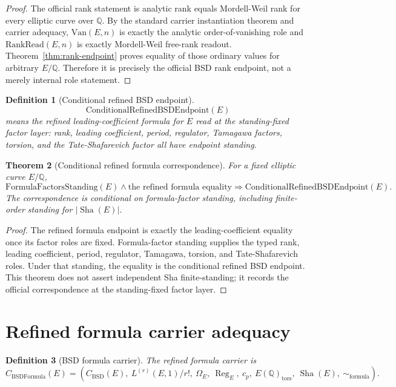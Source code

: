 \documentclass[11pt]{article}
\newtheorem{theorem}{Theorem}[section]
\newtheorem{definition}[theorem]{Definition}
\newcommand{\Q}{\mathbb{Q}}
\newcommand{\Sha}{\operatorname{Sha}}
\newcommand{\Reg}{\operatorname{Reg}}
\newcommand{\tors}{\operatorname{tors}}
\newcommand{\BSD}{\mathrm{BSD}}
\newcommand{\BSDFormula}{\mathrm{BSDFormula}}
\newcommand{\Van}{\mathrm{Van}}
\newcommand{\RankRead}{\mathrm{RankRead}}
\newcommand{\CondRefinedEndpoint}{\mathrm{ConditionalRefinedBSDEndpoint}}
\begin{document}
\begin{proof}
The official rank statement is analytic rank equals Mordell-Weil rank for every elliptic curve over $\Q$. By the standard carrier instantiation theorem and carrier adequacy, $\Van(E,n)$ is exactly the analytic order-of-vanishing role and $\RankRead(E,n)$ is exactly Mordell-Weil free-rank readout. Theorem~\ref{thm:rank-endpoint} proves equality of those ordinary values for arbitrary $E/\Q$. Therefore it is precisely the official BSD rank endpoint, not a merely internal role statement.
\end{proof}

\begin{definition}[Conditional refined BSD endpoint]
\[
\CondRefinedEndpoint(E)
\]
means the refined leading-coefficient formula for $E$ read at the standing-fixed factor layer: rank, leading coefficient, period, regulator, Tamagawa factors, torsion, and the Tate-Shafarevich factor all have endpoint standing.
\end{definition}

\begin{theorem}[Conditional refined formula correspondence]\label{thm:conditional-refined-correspondence}
For a fixed elliptic curve $E/\Q$,
\[
\mathrm{FormulaFactorsStanding}(E)\wedge \text{the refined formula equality}
\Rightarrow
\CondRefinedEndpoint(E).
\]
The correspondence is conditional on formula-factor standing, including finite-order standing for $|\Sha(E)|$.
\end{theorem}

\begin{proof}
The refined formula endpoint is exactly the leading-coefficient equality once its factor roles are fixed. Formula-factor standing supplies the typed rank, leading coefficient, period, regulator, Tamagawa, torsion, and Tate-Shafarevich roles. Under that standing, the equality is the conditional refined BSD endpoint. This theorem does not assert independent Sha finite-standing; it records the official correspondence at the standing-fixed factor layer.
\end{proof}

\section{Refined formula carrier adequacy}

\begin{definition}[BSD formula carrier]
The refined formula carrier is
\[
C_{\BSDFormula}(E)=
(C_{\BSD}(E),\ L^{(r)}(E,1)/r!,\ \Omega_E,\ \Reg_E,\ c_p,\ E(\Q)_{\tors},\ \Sha(E),\ \sim_{\mathrm{formula}}).
\]
\end{definition}
\end{document}
